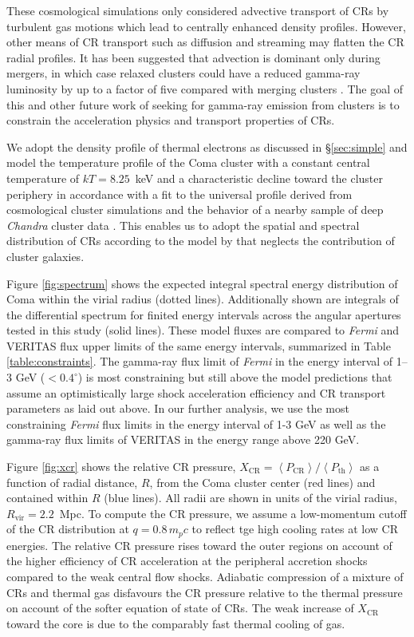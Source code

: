 \documentclass[12pt,manuscript]{aastex}
\newcommand{\expval}[1]{\left\langle #1 \right\rangle}
\newcommand{\rmn}{\mathrm}
\newcommand{\CR}{\mathrm{CR}}
\begin{document}
These cosmological simulations only considered advective transport of CRs by turbulent gas motions
which lead to centrally enhanced density profiles.  However, other means of CR transport such as diffusion
and streaming may flatten the CR radial profiles. It has been suggested that advection is dominant
only during mergers, in which case relaxed clusters could have a reduced gamma-ray luminosity by up
to a factor of five compared with merging clusters
\citep{article:EnsslinPfrommerMiniatiSubramanian:2011}. The goal of this and other future work of
seeking for gamma-ray emission from clusters is to constrain the acceleration physics and transport
properties of CRs.

We adopt the density profile of thermal electrons as discussed in \S \ref{sec:simple} and model the
temperature profile
of the Coma cluster with a constant central temperature of $kT= 8.25$~keV and a characteristic
decline toward the cluster periphery in accordance with a fit to the universal profile derived from
cosmological cluster simulations \citep{article:PinzkePfrommer:2010, article:Pfrommer_etal:2007}
and the behavior of a nearby sample of deep {\em Chandra} cluster data
\citep{article:Vikhlinin_etal:2005}. This enables us to adopt the spatial and spectral distribution
of CRs according to the model by \citet{article:PinzkePfrommer:2010} that neglects the contribution
of cluster galaxies.

Figure \ref{fig:spectrum} shows the expected integral spectral energy distribution of Coma within
the virial radius (dotted lines). Additionally shown are integrals of the differential spectrum for
finited energy intervals across the angular apertures tested in this study (solid lines). These
model fluxes are compared to {\em Fermi} and VERITAS flux upper limits of the same energy intervals,
summarized in Table \ref{table:constraints}.  The gamma-ray flux limit of {\em Fermi} in the energy
interval of 1--3 GeV ($<0.4^\circ$) is most constraining but still above the model predictions that
assume an optimistically large shock acceleration efficiency and CR transport parameters as laid
out above.  In our further analysis, we use the most constraining {\em Fermi} flux limits in the
energy interval of 1-3 GeV as well as the gamma-ray flux limits of VERITAS in the energy range above
220 GeV.

Figure \ref{fig:xcr} shows the relative CR pressure, $X_{\CR} =
\expval{P_{\CR}}/\expval{P_\rmn{th}}$ as a function of radial distance, $R$, from the Coma cluster
center (red lines) and contained within $R$ (blue lines). All radii are shown in units of the virial
radius, $R_\rmn{vir}=2.2$~Mpc. To compute the CR pressure, we assume a low-momentum cutoff of the CR
distribution at $q = 0.8\,m_p c$ to reflect tge high cooling rates at low CR energies. The relative CR
pressure rises toward the outer regions on account of the higher efficiency of CR acceleration at the
peripheral accretion shocks compared to the weak central flow shocks. Adiabatic compression of a
mixture of CRs and thermal gas disfavours the
CR pressure relative to the thermal pressure on account of the softer equation of state of CRs. The
weak increase of $X_{\CR}$ toward the core is due to the comparably fast thermal cooling of gas.
\end{document}
